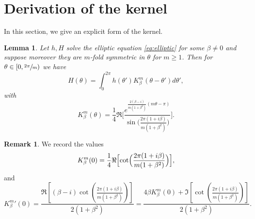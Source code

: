 \documentclass[10pt]{amsart}
\theoremstyle{plain}
\newtheorem{lemma}[theorem]{Lemma}
\theoremstyle{definition}
\newtheorem{remark}[theorem]{Remark}
\let\bt\beta
\let\tht\theta
\begin{document}
\appendix
\section{Derivation of the kernel}

In this section, we give an explicit form of the kernel.

\begin{lemma}\label{lem:ker comp}
Let $h, H$ solve the elliptic equation \eqref{eq:elliptic} for some $\bt\ne0$ and suppose moreover they are $m$-fold symmetric in $\theta$ for $m\geq 1$. Then for $\theta \in [0, \sfrac{2\pi}{m})$ we have
\[
H(\tht)=\int_{0}^{2\pi} h(\tht') K^m_{\beta}(\tht-\tht') d\tht',
\]
with
\[
K^m_{\beta}(\theta)= \frac{1}{4}\Re \biggl[\frac{e^{\frac{2(\beta-i)}{m(1+\beta^2)}(m\theta-\pi)}}{\sin\bigl(\frac{2\pi(1+i\beta)}{m(1+\beta^2)}\bigr)}\biggl].
\]
\end{lemma}
\begin{remark}\label{rem:derv ker 0}
We record the values
\[
K_\beta^m(0)=\frac{1}{4}\Re\Bigl[\cot\Bigl(\frac{2\pi(1+i\beta)}{m(1+\beta^2)}\Bigr)\Bigr],
\]
and
\[
{K_\beta^m} '(0)=\frac{\Re\left[(\beta-i)\cot\left(\frac{2\pi(1+i\beta)}{m(1+\beta^2)}\right)\right]}{2(1+\beta^2)}=\frac{4\beta K_\beta^m(0)+\Im\left[\cot\left(\frac{2\pi(1+i\beta)}{m(1+\beta^2)}\right)\right]}{2(1+\beta^2)}.
\]
\end{remark}
\end{document}
